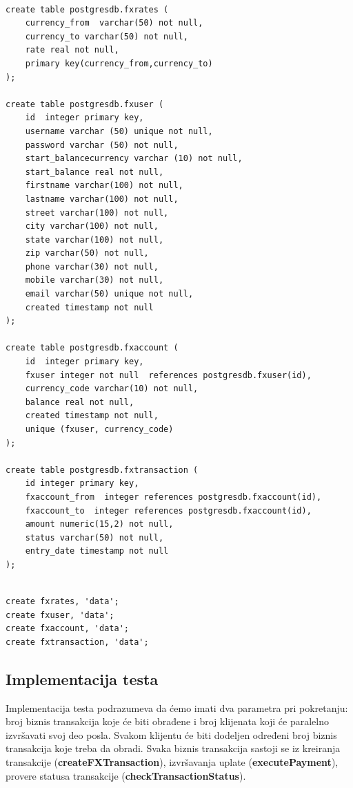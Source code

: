 \documentclass[12pt,oneside]{memoir}
\begin{document}
\begin{lstlisting}[title={setup-postgres-model.sql},captionpos=t]

create table postgresdb.fxrates (
	currency_from  varchar(50) not null,
	currency_to varchar(50) not null,
	rate real not null,
	primary key(currency_from,currency_to)
);

create table postgresdb.fxuser (
	id  integer primary key,
	username varchar (50) unique not null,
	password varchar (50) not null,
	start_balancecurrency varchar (10) not null,
	start_balance real not null,
	firstname varchar(100) not null,
	lastname varchar(100) not null,
	street varchar(100) not null,
	city varchar(100) not null,
	state varchar(100) not null,
	zip varchar(50) not null,
	phone varchar(30) not null,
	mobile varchar(30) not null,
	email varchar(50) unique not null,
	created timestamp not null
);

create table postgresdb.fxaccount (
	id  integer primary key,
	fxuser integer not null  references postgresdb.fxuser(id),
	currency_code varchar(10) not null,
	balance real not null,
	created timestamp not null,
	unique (fxuser, currency_code)
);

create table postgresdb.fxtransaction (
	id integer primary key,
	fxaccount_from  integer references postgresdb.fxaccount(id),
	fxaccount_to  integer references postgresdb.fxaccount(id),
	amount numeric(15,2) not null,
	status varchar(50) not null,
	entry_date timestamp not null
);


\end{lstlisting}


\begin{lstlisting}[title={setup-hbase-model.sh},captionpos=t]
create fxrates, 'data';
create fxuser, 'data';
create fxaccount, 'data';
create fxtransaction, 'data';
\end{lstlisting}

\subsection{Implementacija testa}

Implementacija testa podrazumeva da ćemo imati dva parametra pri pokretanju: broj biznis transakcija koje će biti obrađene i broj klijenata koji će paralelno izvršavati svoj deo posla. Svakom klijentu će biti dodeljen određeni broj biznis transakcija koje treba da obradi. Svaka biznis transakcija sastoji se iz kreiranja transakcije (\textbf{createFXTransaction}), izvršavanja uplate (\textbf{executePayment}), provere statusa transakcije (\textbf{checkTransactionStatus}). 
\end{document}
